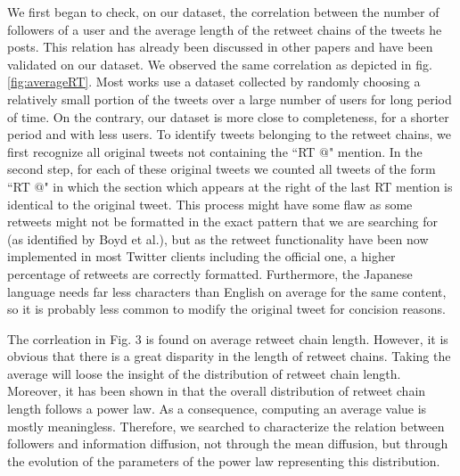 \documentclass[conference]{IEEEtran}
\begin{document}
We first began to check, on our dataset, the correlation between the number of followers of a user and the average length of the retweet chains of the tweets he posts. This relation has already been discussed in other papers and have been validated on our dataset. We observed the same correlation as depicted in fig. \ref{fig:averageRT}.
Most works use a dataset collected by randomly choosing a relatively small portion of the tweets over a large number of users for long period of time. On the contrary, our dataset is more close to completeness, for a shorter period and with less users. To identify tweets belonging to the retweet chains, we first recognize all original tweets not containing the ``RT $@$" mention. In the second step, for each of these original tweets we counted all tweets of the form ``RT $@$" in which the section which appears at the right of the last RT mention is identical to the original tweet. This process might have some flaw as some retweets might not be formatted in the exact pattern that we are searching for (as identified by Boyd et al.\cite{boyd2010tweet}), but as the retweet functionality have been now implemented in most Twitter clients including the official one, a higher percentage of retweets are correctly formatted. Furthermore, the Japanese language needs far less characters than English on average for the same content, so it is probably less common to modify the original tweet for concision reasons.

The corrleation in Fig. 3 is found on average retweet chain length. However, it is obvious that there is a great disparity in the length of retweet chains. Taking the average will loose the insight of the distribution of  retweet chain length. Moreover, it has been shown in \cite{bakshy2011everyone} that the overall distribution of retweet chain length follows a power law. As a consequence, computing an average value is mostly meaningless. Therefore, we searched to characterize the relation between followers and information diffusion, not through the mean diffusion, but through the evolution of the parameters of the power law representing this distribution.
\end{document}
